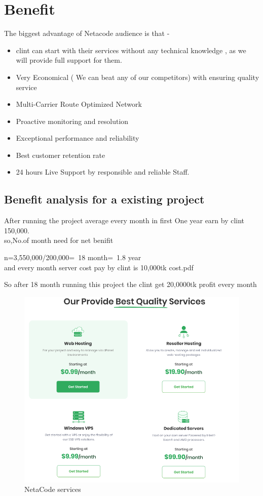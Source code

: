 \documentclass[a4paper,12pt]{report}
\begin{document}
\section{Benefit}
The biggest advantage of Netacode audience is that -
\begin{itemize}
	\item	clint can start with their services without any technical
	knowledge , as we will provide full support for them.
	\item Very Economical ( We can beat any of our competitors) with ensuring quality service
	\item Multi-Carrier Route Optimized Network
	\item Proactive monitoring and resolution
	\item Exceptional performance and reliability
	\item Best customer retention rate
	\item 24 hours Live Support by responsible and reliable Staff.
\end{itemize} 
\subsection{Benefit analysis for a existing project}
After running the project average every month in first One year  earn by clint 150,000.\\
so,No.of month  need for net benifit\begin{center}
	n=3,550,000/200,000=~18 month=~1.8 year \\
	and every month server cost pay  by clint is 10,000tk
	 {cost.pdf}
\end{center} 
So after 18 month running this project the clint get 20,0000tk profit every month
\begin{figure}[h]
	\centering
	\includegraphics[width=0.8\linewidth]{8_4}
	\caption{NetaCode services}
	\label{fig:84}
\end{figure}
\end{document}

